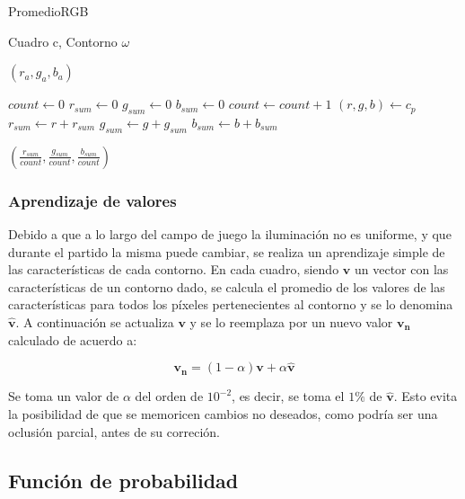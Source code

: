 \begin{algorithm}
    \caption{PromedioRGB}
    \label{alg:carac-rgb}
    \begin{algorithmic}
    \Require\hspace{\algorithmicindent}\hspace{\algorithmicindent}Cuadro c, Contorno $\omega$

    \Ensure\hspace{\algorithmicindent}\hspace{0.23cm} $(r_a, g_a, b_a)$
    \State

    \State $count \gets 0$
    \State $r_{sum} \gets 0$
    \State $g_{sum} \gets 0$
    \State $b_{sum} \gets 0$
        \State $count \gets count + 1$
        \State $(r, g, b) \gets c_{p}$
        \State $r_{sum} \gets r + r_{sum}$
        \State $g_{sum} \gets g + g_{sum}$
        \State $b_{sum} \gets b + b_{sum}$
    \EndFor

    \State \Return $ (\frac{r_{sum}}{count}, \frac{g_{sum}}{count}, \frac{b_{sum}}{count}) $
    \end{algorithmic}
\end{algorithm}


\subsubsection{Aprendizaje de valores}

Debido a que a lo largo del campo de juego la iluminación no es uniforme, y que
durante el partido la misma puede cambiar, se realiza un aprendizaje simple
de las características de cada contorno. En cada cuadro, siendo $\mathbf{v}$ un
vector con las características de un contorno dado, se calcula el promedio de
los valores de las características para todos los píxeles pertenecientes al
contorno y se lo denomina $\hat{\mathbf{v}}$. A continuación se actualiza
$\mathbf{v}$ y se lo reemplaza por un nuevo valor $\mathbf{v_n}$ calculado de
acuerdo a:

\[
  \mathbf{v_n} = \left(1-\alpha\right)\mathbf{v} + \alpha \hat{\mathbf{v}}
\]

Se toma un valor de $\alpha$ del orden de $10^{-2}$, es decir, se toma el $1\%$
de $\hat{\mathbf{v}}$. Esto evita la posibilidad de que se memoricen cambios
no deseados, como podría ser una oclusión parcial, antes de su correción.

\subsection{Función de probabilidad}

